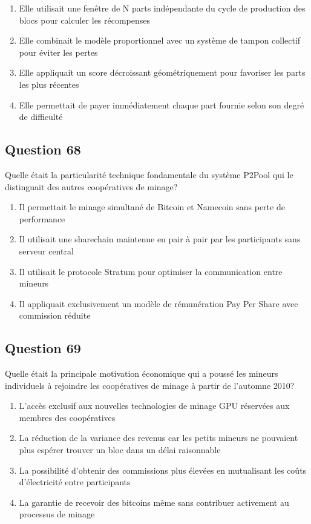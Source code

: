 \documentclass[12pt,a4paper]{article}
\begin{document}
\begin{enumerate}[label=\Alph*., leftmargin=*]
\item Elle utilisait une fenêtre de N parts indépendante du cycle de production des blocs pour calculer les récompenses
\item Elle combinait le modèle proportionnel avec un système de tampon collectif pour éviter les pertes
\item Elle appliquait un score décroissant géométriquement pour favoriser les parts les plus récentes
\item Elle permettait de payer immédiatement chaque part fournie selon son degré de difficulté
\end{enumerate}

\bigskip


\subsection*{Question 68}
Quelle était la particularité technique fondamentale du système P2Pool qui le distinguait des autres coopératives de minage?

\begin{enumerate}[label=\Alph*., leftmargin=*]
\item Il permettait le minage simultané de Bitcoin et Namecoin sans perte de performance
\item Il utilisait une sharechain maintenue en pair à pair par les participants sans serveur central
\item Il utilisait le protocole Stratum pour optimiser la communication entre mineurs
\item Il appliquait exclusivement un modèle de rémunération Pay Per Share avec commission réduite
\end{enumerate}

\bigskip


\subsection*{Question 69}
Quelle était la principale motivation économique qui a poussé les mineurs individuels à rejoindre les coopératives de minage à partir de l'automne 2010?

\begin{enumerate}[label=\Alph*., leftmargin=*]
\item L'accès exclusif aux nouvelles technologies de minage GPU réservées aux membres des coopératives
\item La réduction de la variance des revenus car les petits mineurs ne pouvaient plus espérer trouver un bloc dans un délai raisonnable
\item La possibilité d'obtenir des commissions plus élevées en mutualisant les coûts d'électricité entre participants
\item La garantie de recevoir des bitcoins même sans contribuer activement au processus de minage
\end{enumerate}
\end{document}
